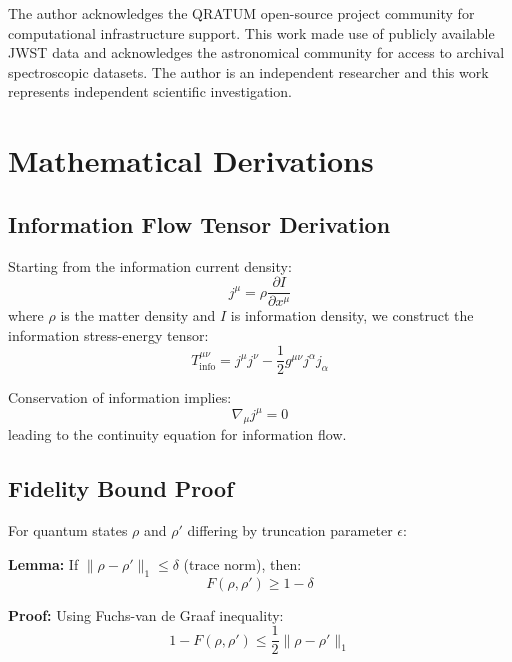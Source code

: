 \documentclass[twocolumn,aps,prd,superscriptaddress,nofootinbib]{revtex4-2}
\begin{document}
\begin{acknowledgments}
The author acknowledges the QRATUM open-source project community for computational infrastructure support. This work made use of publicly available JWST data and acknowledges the astronomical community for access to archival spectroscopic datasets. The author is an independent researcher and this work represents independent scientific investigation.
\end{acknowledgments}

\appendix

\section{Mathematical Derivations}

\subsection{Information Flow Tensor Derivation}

Starting from the information current density:
\begin{equation}
j^\mu = \rho \frac{\partial I}{\partial x^\mu}
\end{equation}
where $\rho$ is the matter density and $I$ is information density, we construct the information stress-energy tensor:
\begin{equation}
T_{\text{info}}^{\mu\nu} = j^\mu j^\nu - \frac{1}{2} g^{\mu\nu} j^\alpha j_\alpha
\end{equation}

Conservation of information implies:
\begin{equation}
\nabla_\mu j^\mu = 0
\end{equation}
leading to the continuity equation for information flow.

\subsection{Fidelity Bound Proof}

For quantum states $\rho$ and $\rho'$ differing by truncation parameter $\epsilon$:

\textbf{Lemma:} If $\|\rho - \rho'\|_1 \leq \delta$ (trace norm), then:
\begin{equation}
F(\rho, \rho') \geq 1 - \delta
\end{equation}

\textbf{Proof:} Using Fuchs-van de Graaf inequality:
\begin{equation}
1 - F(\rho, \rho') \leq \frac{1}{2}\|\rho - \rho'\|_1
\end{equation}
\end{document}
